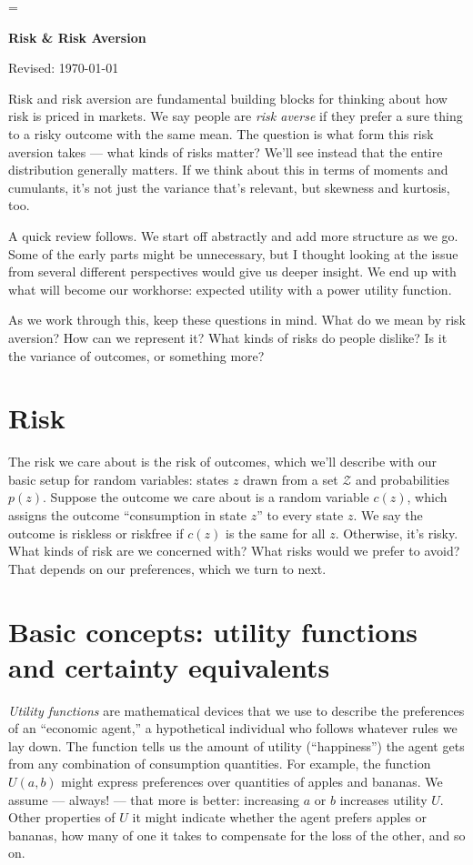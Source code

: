 \documentclass[11pt]{article}
\begin{document}
\parskip=\bigskipamount
\parindent=0.0in
\thispagestyle{empty}


\bigskip\bigskip
\centerline{\Large \bf Risk \& Risk Aversion}
\centerline{Revised: \today}

\medskip
Risk and risk aversion are fundamental building blocks
for thinking about how risk is priced in markets.
We say people are {\it risk averse\/} if they
prefer a sure thing to a risky outcome with the same mean.
The question is what form this risk aversion takes --- what kinds of risks matter?
We'll see instead that the entire distribution generally matters.
If we think about this in terms of moments and cumulants,
it's not just the variance that's relevant,
but skewness and kurtosis, too.

A quick review follows.
We start off abstractly and add more structure as we go.
Some of the early parts might be unnecessary,
but I thought looking at the issue from several different
perspectives would give us deeper insight.
We end up with what will become our workhorse:
expected utility with a power utility function.

As we work through this, keep these questions in mind.
What do we mean by risk aversion?
How can we represent it?
What kinds of risks do people dislike?
Is it the variance of outcomes, or something more?


\section{Risk}

The risk we care about is the risk of outcomes,
which we'll describe with our basic setup for random variables:
states $z$ drawn from a set $\mathcal{Z}$ and probabilities $p(z)$.
Suppose the outcome we care about is a random variable $c(z)$,
which assigns the outcome ``consumption in state $z$''
to every state $z$.
We say the outcome is riskless or riskfree if $c(z)$ is
the same for all $z$.
Otherwise, it's risky.
What kinds of risk are we concerned with?
What risks would we prefer to avoid?
That depends on our preferences, which we turn to next.


\section{Basic concepts:  utility functions and certainty equivalents}

{\it Utility functions\/} are mathematical devices that we use
to describe the preferences of an ``economic agent,''
a hypothetical individual who follows whatever rules we lay down.
The function tells us the amount of utility (``happiness'')
the agent gets from any combination of consumption quantities.
For example, the function $U(a,b)$ might express preferences
over quantities of apples and bananas.
We assume --- always! --- that more is better:
increasing $a$ or $b$ increases utility $U$.
Other properties of $U$ it might indicate
whether the agent prefers apples or bananas,
how many of one it takes to compensate for the loss of the other,
and so on.
\end{document}

